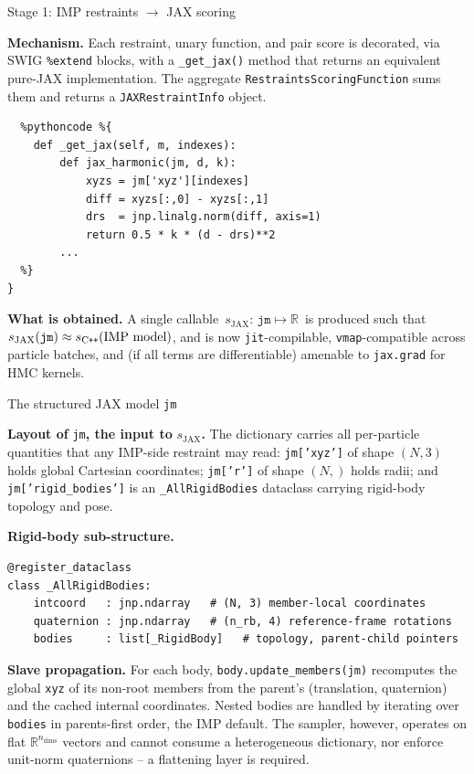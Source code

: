 \documentclass[10pt,aspectratio=169]{beamer}
\begin{document}
\begin{frame}[fragile]{Stage 1: IMP restraints \(\to\) JAX scoring}

\textbf{Mechanism.}
Each restraint, unary function, and pair score is decorated, via SWIG
\texttt{\%extend} blocks, with a \texttt{\_get\_jax()} method that returns
an equivalent pure-JAX implementation. The aggregate
\texttt{RestraintsScoringFunction} sums them and returns a
\texttt{JAXRestraintInfo} object.

\begin{lstlisting}[style=py]
%extend IMP::core::HarmonicDistancePairScore {
  %pythoncode %{
    def _get_jax(self, m, indexes):
        def jax_harmonic(jm, d, k):
            xyzs = jm['xyz'][indexes]
            diff = xyzs[:,0] - xyzs[:,1]
            drs  = jnp.linalg.norm(diff, axis=1)
            return 0.5 * k * (d - drs)**2
        ...
  %}
}
\end{lstlisting}

\textbf{What is obtained.}
A single callable \(\,s_\text{JAX}:\, \texttt{jm} \mapsto \mathbb{R}\,\) is
produced such that
\(s_\text{JAX}(\texttt{jm}) \approx s_\text{C\texttt{++}}(\text{IMP model})\),
and is now \texttt{jit}-compilable, \texttt{vmap}-compatible across
particle batches, and (if all terms are differentiable) amenable to
\texttt{jax.grad} for HMC kernels.

\end{frame}

\begin{frame}[fragile]{The structured JAX model \texttt{jm}}

\textbf{Layout of} \texttt{jm}\textbf{, the input to} \(s_\text{JAX}\)\textbf{.}
The dictionary carries all per-particle quantities that any IMP-side
restraint may read:
\texttt{jm['xyz']} of shape \((N,3)\) holds global Cartesian coordinates;
\texttt{jm['r']} of shape \((N,)\) holds radii; and
\texttt{jm['rigid\_bodies']} is an \texttt{\_AllRigidBodies} dataclass
carrying rigid-body topology and pose.

\textbf{Rigid-body sub-structure.}
\begin{lstlisting}[style=py]
@register_dataclass
class _AllRigidBodies:
    intcoord   : jnp.ndarray   # (N, 3) member-local coordinates
    quaternion : jnp.ndarray   # (n_rb, 4) reference-frame rotations
    bodies     : list[_RigidBody]   # topology, parent-child pointers
\end{lstlisting}

\textbf{Slave propagation.}
For each body, \texttt{body.update\_members(jm)} recomputes the global
\texttt{xyz} of its non-root members from the parent's
(translation, quaternion) and the cached internal coordinates. Nested
bodies are handled by iterating over \texttt{bodies} in parents-first
order, the IMP default. The sampler, however, operates on flat
\(\mathbb{R}^{n_\text{dims}}\) vectors and cannot consume a heterogeneous
dictionary, nor enforce unit-norm quaternions -- a flattening layer is
required.

\end{frame}
\end{document}
